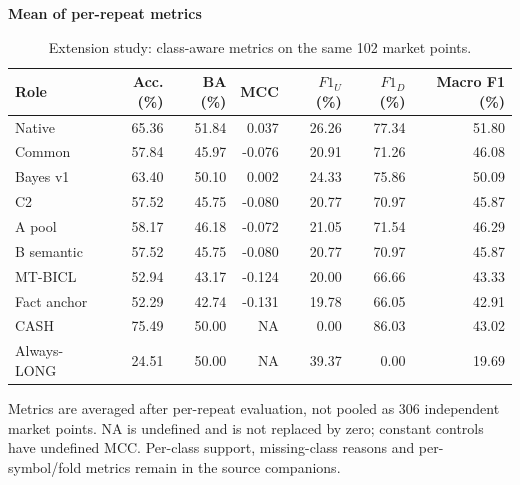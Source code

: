 \begin{table}[!htb]
\centering\small
\setlength{\tabcolsep}{3pt}
\renewcommand{\arraystretch}{1.12}
\caption{Extension study: class-aware metrics on the same 102 market points.}
\label{tab:u09-classification}
\textbf{Mean of per-repeat metrics}\par\smallskip
\begin{tabular}{lrrrrrr}
\hline
Role & Acc. (\%) & BA (\%) & MCC & $F1_U$ (\%) & $F1_D$ (\%) & Macro F1 (\%) \\
\hline
Native & 65.36 & 51.84 & 0.037 & 26.26 & 77.34 & 51.80 \\
Common & 57.84 & 45.97 & -0.076 & 20.91 & 71.26 & 46.08 \\
Bayes v1 & 63.40 & 50.10 & 0.002 & 24.33 & 75.86 & 50.09 \\
C2 & 57.52 & 45.75 & -0.080 & 20.77 & 70.97 & 45.87 \\
A pool & 58.17 & 46.18 & -0.072 & 21.05 & 71.54 & 46.29 \\
B semantic & 57.52 & 45.75 & -0.080 & 20.77 & 70.97 & 45.87 \\
MT-BICL & 52.94 & 43.17 & -0.124 & 20.00 & 66.66 & 43.33 \\
Fact anchor & 52.29 & 42.74 & -0.131 & 19.78 & 66.05 & 42.91 \\
CASH & 75.49 & 50.00 & NA & 0.00 & 86.03 & 43.02 \\
Always-LONG & 24.51 & 50.00 & NA & 39.37 & 0.00 & 19.69 \\
\hline
\end{tabular}\par\medskip
\begin{minipage}{\textwidth}\footnotesize Metrics are averaged after per-repeat evaluation, not pooled as 306 independent market points. NA is undefined and is not replaced by zero; constant controls have undefined MCC. Per-class support, missing-class reasons and per-symbol/fold metrics remain in the source companions.\end{minipage}
\end{table}
